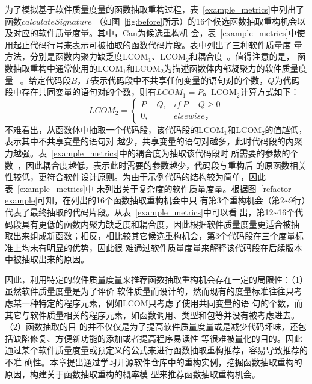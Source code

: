 为了模拟基于软件质量度量的函数抽取重构过程，表~\ref{example_metrics}中列出了函数$calculateSignature$
（如图~\ref{fig:before}所示）的16个候选函数抽取重构机会以及对应的软件质量度量。其中，Can为候选重构机
会，表~\ref{example_metrics}中使用起止代码行号来表示可被抽取的函数代码片段。表中列出了三种软件质量度
量方法，分别是函数内聚力缺乏度LCOM$_1$、LCOM$_2$和耦合度~\cite{yang2009identifying}。值得注意的是，
函数抽取重构中通常使用的LCOM$_1$和LCOM$_2$为描述函数体内部凝聚力的软件质量度量
~\cite{charalampidou2015size}。给定代码段$B$，$P$表示代码段中不共享任何变量的语句对的个数，$Q$为代码
段中存在共同变量的语句对的个数，则有$LCOM_1=P$。LCOM$_2$计算方式如下：
\begin{equation}\label{eq:lcom2}
      LCOM_2 = 
       \begin{cases}
             P-Q, & \textit{if}~P-Q\geq 0\\ 
  0, & elsewise，  
       \end{cases}
\end{equation}
不难看出，从函数体中抽取一个代码段，该代码段的LCOM$_1$和LCOM$_2$的值越低，表示其中不共享变量的语句对
越少，共享变量的语句对越多，此时代码段的内聚力越强。表~\ref{example_metrics}中的耦合度为抽取该代码段时
所需要的参数的个数~\cite{yang2009identifying}，因此耦合度越低，表示此时需要的参数越少，代码段与重构后
的原函数相关性较低，更符合软件设计原则。为由于示例代码的结构较为简单，因此表~\ref{example_metrics}中
未列出关于复杂度的软件质量度量。根据图~\ref{refactor-example}可知，在列出的16个函数抽取重构机会中只
有第3个重构机会（第2\textasciitilde9行）代表了最终抽取的代码片段。从表~\ref{example_metrics}中可以看
出，第12\textasciitilde16个代码段具有更低的函数内聚力缺乏度和耦合度，因此根据软件质量度量更适合被抽
取出来组成新函数；相反，相比较其它候选重构机会，第3个代码段在三个度量标准上均未有明显的优势，因此很
难通过软件质量度量来解释该代码段在后续版本中被抽取出来的原因。

因此，利用特定的软件质量度量来推荐函数抽取重构机会存在一定的局限性：（1）虽然软件质量度量是为了评价
软件质量而设计的，然而现有的度量标准往往只考虑某一种特定的程序元素，例如LCOM只考虑了使用共同变量的语
句的个数，而其它与软件质量相关的程序元素，如函数调用、类型和包等并没有被考虑进去。（2）函数抽取的目
的并不仅仅是为了提高软件质量度量或是减少代码坏味，还包括缺陷修复、方便新功能的添加或者提高程序易读性
等很难被量化的目的。因此通过某个软件质量度量或预定义的公式来进行函数抽取重构推荐，容易导致推荐的不准
确性。本章提出通过学习开源软件仓库中的重构实例，挖掘函数抽取重构的原因，构建关于函数抽取重构的概率模
型来推荐函数抽取重构机会。

